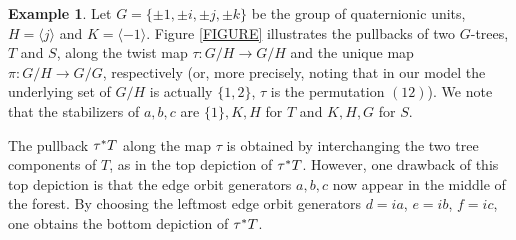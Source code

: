 \documentclass[a4paper,10pt
,draft
]{article}%
\numberwithin{equation}{section}
\numberwithin{figure}{section}
\theoremstyle{definition} %
\newtheorem{example}[equation]{Example}%
\newcommand{\1}{\ensuremath{\mathbbm 1}}%
\begin{document}
\begin{example}\label{ROOTPULL EX}
Let $G=\{\pm 1, \pm i, \pm j, \pm k\}$ be the group of quaternionic units, 
$H = \langle j \rangle$ and $K = \langle -1 \rangle$.
Figure \ref{FIGURE} illustrates the pullbacks of two $G$-trees, 
$T$ and $S$,
along the 
twist map $\tau \colon G/H \to G/H$
and the unique map $\pi \colon G/H \to G/G$, respectively
(or, more precisely, noting that in our model the underlying set 
of $G/H$ is actually $\{1,2\}$,
$\tau$ is the permutation $(12)$).
We note that the stabilizers of $a,b,c$ are $\{1\},K,H$ for $T$
and $K,H,G$ for $S$.

The pullback $\tau^{\**} T$ along the map $\tau$
is obtained by interchanging the two tree components of $T$,
as in the top depiction of $\tau^{\**} T$. 
However, one drawback of this top depiction 
is that the edge orbit generators $a,b,c$ now
appear in the middle of the forest.
By choosing the leftmost 
edge orbit generators
$d = i a$, $e = i b$, $f = i c$,
one obtains the bottom depiction of $\tau^{\**} T$. 


\end{example}
\end{document}
